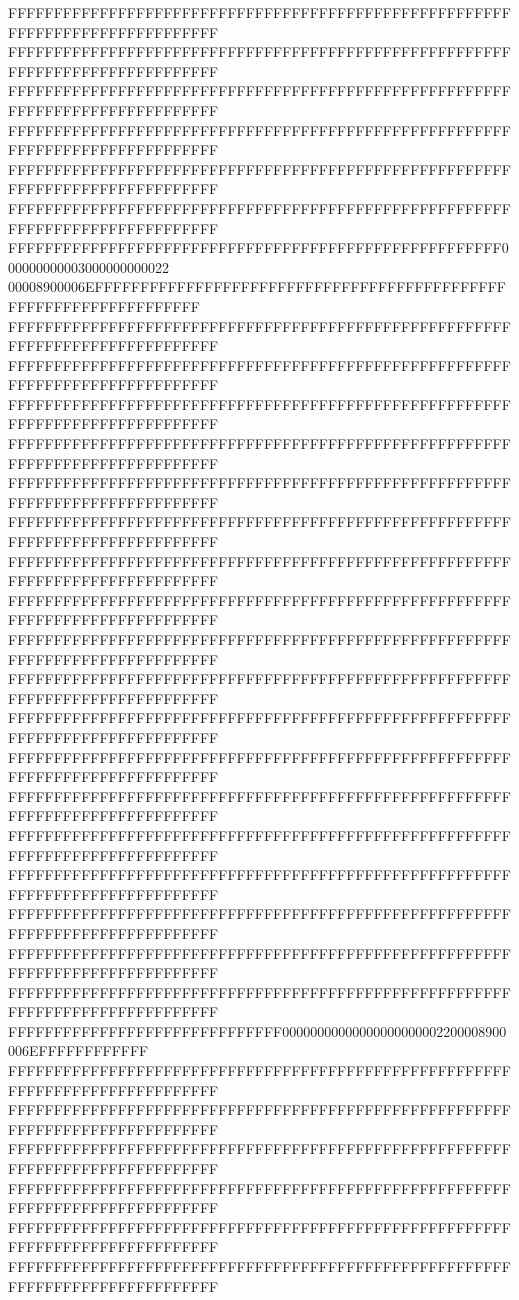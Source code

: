 FFFFFFFFFFFFFFFFFFFFFFFFFFFFFFFFFFFFFFFFFFFFFFFFFFFFFFFFFFFFFFFFFFFFFFFFFFFFFF
FFFFFFFFFFFFFFFFFFFFFFFFFFFFFFFFFFFFFFFFFFFFFFFFFFFFFFFFFFFFFFFFFFFFFFFFFFFFFF
FFFFFFFFFFFFFFFFFFFFFFFFFFFFFFFFFFFFFFFFFFFFFFFFFFFFFFFFFFFFFFFFFFFFFFFFFFFFFF
FFFFFFFFFFFFFFFFFFFFFFFFFFFFFFFFFFFFFFFFFFFFFFFFFFFFFFFFFFFFFFFFFFFFFFFFFFFFFF
FFFFFFFFFFFFFFFFFFFFFFFFFFFFFFFFFFFFFFFFFFFFFFFFFFFFFFFFFFFFFFFFFFFFFFFFFFFFFF
FFFFFFFFFFFFFFFFFFFFFFFFFFFFFFFFFFFFFFFFFFFFFFFFFFFFFFFFFFFFFFFFFFFFFFFFFFFFFF
FFFFFFFFFFFFFFFFFFFFFFFFFFFFFFFFFFFFFFFFFFFFFFFFFFFFFF000000000003000000000022
00008900006EFFFFFFFFFFFFFFFFFFFFFFFFFFFFFFFFFFFFFFFFFFFFFFFFFFFFFFFFFFFFFFFFFF
FFFFFFFFFFFFFFFFFFFFFFFFFFFFFFFFFFFFFFFFFFFFFFFFFFFFFFFFFFFFFFFFFFFFFFFFFFFFFF
FFFFFFFFFFFFFFFFFFFFFFFFFFFFFFFFFFFFFFFFFFFFFFFFFFFFFFFFFFFFFFFFFFFFFFFFFFFFFF
FFFFFFFFFFFFFFFFFFFFFFFFFFFFFFFFFFFFFFFFFFFFFFFFFFFFFFFFFFFFFFFFFFFFFFFFFFFFFF
FFFFFFFFFFFFFFFFFFFFFFFFFFFFFFFFFFFFFFFFFFFFFFFFFFFFFFFFFFFFFFFFFFFFFFFFFFFFFF
FFFFFFFFFFFFFFFFFFFFFFFFFFFFFFFFFFFFFFFFFFFFFFFFFFFFFFFFFFFFFFFFFFFFFFFFFFFFFF
FFFFFFFFFFFFFFFFFFFFFFFFFFFFFFFFFFFFFFFFFFFFFFFFFFFFFFFFFFFFFFFFFFFFFFFFFFFFFF
FFFFFFFFFFFFFFFFFFFFFFFFFFFFFFFFFFFFFFFFFFFFFFFFFFFFFFFFFFFFFFFFFFFFFFFFFFFFFF
FFFFFFFFFFFFFFFFFFFFFFFFFFFFFFFFFFFFFFFFFFFFFFFFFFFFFFFFFFFFFFFFFFFFFFFFFFFFFF
FFFFFFFFFFFFFFFFFFFFFFFFFFFFFFFFFFFFFFFFFFFFFFFFFFFFFFFFFFFFFFFFFFFFFFFFFFFFFF
FFFFFFFFFFFFFFFFFFFFFFFFFFFFFFFFFFFFFFFFFFFFFFFFFFFFFFFFFFFFFFFFFFFFFFFFFFFFFF
FFFFFFFFFFFFFFFFFFFFFFFFFFFFFFFFFFFFFFFFFFFFFFFFFFFFFFFFFFFFFFFFFFFFFFFFFFFFFF
FFFFFFFFFFFFFFFFFFFFFFFFFFFFFFFFFFFFFFFFFFFFFFFFFFFFFFFFFFFFFFFFFFFFFFFFFFFFFF
FFFFFFFFFFFFFFFFFFFFFFFFFFFFFFFFFFFFFFFFFFFFFFFFFFFFFFFFFFFFFFFFFFFFFFFFFFFFFF
FFFFFFFFFFFFFFFFFFFFFFFFFFFFFFFFFFFFFFFFFFFFFFFFFFFFFFFFFFFFFFFFFFFFFFFFFFFFFF
FFFFFFFFFFFFFFFFFFFFFFFFFFFFFFFFFFFFFFFFFFFFFFFFFFFFFFFFFFFFFFFFFFFFFFFFFFFFFF
FFFFFFFFFFFFFFFFFFFFFFFFFFFFFFFFFFFFFFFFFFFFFFFFFFFFFFFFFFFFFFFFFFFFFFFFFFFFFF
FFFFFFFFFFFFFFFFFFFFFFFFFFFFFFFFFFFFFFFFFFFFFFFFFFFFFFFFFFFFFFFFFFFFFFFFFFFFFF
FFFFFFFFFFFFFFFFFFFFFFFFFFFFFFFFFFFFFFFFFFFFFFFFFFFFFFFFFFFFFFFFFFFFFFFFFFFFFF
FFFFFFFFFFFFFFFFFFFFFFFFFFFFFF00000000000000000000002200008900006EFFFFFFFFFFFF
FFFFFFFFFFFFFFFFFFFFFFFFFFFFFFFFFFFFFFFFFFFFFFFFFFFFFFFFFFFFFFFFFFFFFFFFFFFFFF
FFFFFFFFFFFFFFFFFFFFFFFFFFFFFFFFFFFFFFFFFFFFFFFFFFFFFFFFFFFFFFFFFFFFFFFFFFFFFF
FFFFFFFFFFFFFFFFFFFFFFFFFFFFFFFFFFFFFFFFFFFFFFFFFFFFFFFFFFFFFFFFFFFFFFFFFFFFFF
FFFFFFFFFFFFFFFFFFFFFFFFFFFFFFFFFFFFFFFFFFFFFFFFFFFFFFFFFFFFFFFFFFFFFFFFFFFFFF
FFFFFFFFFFFFFFFFFFFFFFFFFFFFFFFFFFFFFFFFFFFFFFFFFFFFFFFFFFFFFFFFFFFFFFFFFFFFFF
FFFFFFFFFFFFFFFFFFFFFFFFFFFFFFFFFFFFFFFFFFFFFFFFFFFFFFFFFFFFFFFFFFFFFFFFFFFFFF
